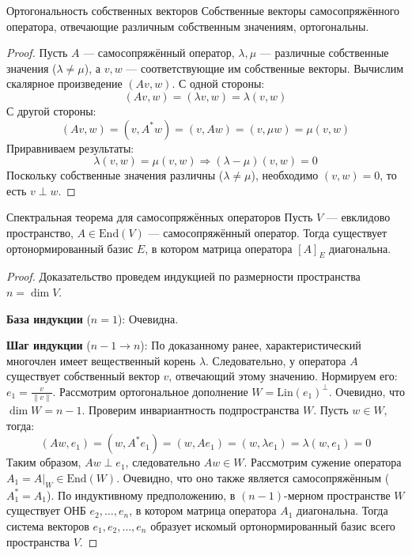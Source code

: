 \begin{Proposition}{Ортогональность собственных векторов}{}
	Собственные векторы самосопряжённого оператора, отвечающие различным собственным значениям, ортогональны.
\end{Proposition}

\begin{proof}
	Пусть $A$ — самосопряжённый оператор, $\lambda, \mu$ — различные собственные значения ($\lambda \neq \mu$), а $v, w$ — соответствующие им собственные векторы.
	Вычислим скалярное произведение $(Av, w)$.
	С одной стороны:
	\[
	(Av, w) = (\lambda v, w) = \lambda (v, w)
	\] 
	С другой стороны:
	\[
	(Av, w) = (v, A^* w) = (v, Aw) = (v, \mu w) = \mu (v, w)
	\] 
	Приравниваем результаты:
	\[
	\lambda (v, w) = \mu (v, w) \Rightarrow (\lambda - \mu)(v, w) = 0
	\] 
	Поскольку собственные значения различны ($\lambda \neq \mu$), необходимо $(v, w) = 0$, то есть $v \perp w$.
\end{proof}

\begin{Theorem}{Спектральная теорема для самосопряжённых операторов}{}
	Пусть $V$ — евклидово пространство, $A \in \mathrm{End}(V)$ — самосопряжённый оператор.
	Тогда существует ортонормированный базис $E$, в котором матрица оператора $[A]_E$ диагональна.
\end{Theorem}

\begin{proof}
	Доказательство проведем индукцией по размерности пространства $n = \dim V$.

	\textbf{База индукции} ($n = 1$): Очевидна.
	
	\textbf{Шаг индукции} ($n - 1 \to n$):
	По доказанному ранее, характеристический многочлен имеет вещественный корень $\lambda$.
	Следовательно, у оператора $A$ существует собственный вектор $v$, отвечающий этому значению. Нормируем его: $e_1 = \frac{v}{\|v\|}$.
	Рассмотрим ортогональное дополнение $W = \mathrm{Lin}(e_1)^\perp$. Очевидно, что $\dim W = n - 1$.
	Проверим инвариантность подпространства $W$.
	Пусть $w \in W$, тогда:
	\[
	(Aw, e_1) = (w, A^* e_1) = (w, A e_1) = (w, \lambda e_1) = \lambda (w, e_1) = 0
	\] 
	Таким образом, $Aw \perp e_1$, следовательно $Aw \in W$.
	Рассмотрим сужение оператора $A_1 = A|_W \in \mathrm{End}(W)$. Очевидно, что оно также является самосопряжённым ($A_1^* = A_1$).
	По индуктивному предположению, в $(n-1)$-мерном пространстве $W$ существует ОНБ $e_2, \dots, e_n$, в котором матрица оператора $A_1$ диагональна.
	Тогда система векторов $e_1, e_2, \dots, e_n$ образует искомый ортонормированный базис всего пространства $V$.
\end{proof}
